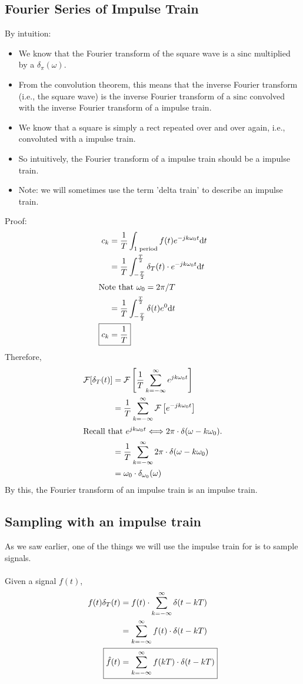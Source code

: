\documentclass[10pt]{article}
\newcommand{\sinc}{\text{sinc}}
\newcommand{\rect}{\text{rect}}
\newcommand{\llra}{\Longleftrightarrow}
\newcommand{\fourier}{\mathcal{F}}
\newcommand{\dd}{\text{d}}
\begin{document}
\subsection*{Fourier Series of Impulse Train}
By intuition:
\begin{itemize}
    \item We know that the Fourier transform of the square wave is a $\sinc$ multiplied by a $\delta_\pi(\omega)$.
    \item From the convolution theorem, this means that the inverse Fourier transform (i.e., the square wave) is the inverse Fourier transform of a $\sinc$ convolved with the inverse Fourier transform of a impulse train.
    \item We know that a square is simply a $\rect$ repeated over and over again, i.e., convoluted with a impulse train.
    \item So intuitively, the Fourier transform of a impulse train should be a impulse train.
    \item Note: we will sometimes use the term 'delta train' to describe an impulse train.
\end{itemize}
Proof:
\begin{align*}
    c_k &= \frac{1}{T} \int_{\text{1 period}} f(t) e^{-jk\omega_0 t} \dd t\\
    &= \frac{1}{T} \int_{-\frac{T}{2}}^{\frac{T}{2}} \delta_T(t) \cdot e^{-jk\omega_0 t} \dd t\\
    \intertext{Note that $\omega_0 = 2\pi/T$}
    &= \frac{1}{T} \int_{-\frac{T}{2}}^{\frac{T}{2}} \delta(t) e^0 \dd t\\
    \Aboxed{c_k &= \frac{1}{T}}
\end{align*}
Therefore,
\begin{align*}
    \fourier[\delta_T(t)] &= \fourier\left[\frac{1}{T} \sum_{k=-\infty}^\infty e^{jk\omega_0 t}\right]\\
    &= \frac{1}{T} \sum_{k=-\infty}^\infty \fourier\left[e^{-jk\omega_0 t}\right]\\
    \intertext{Recall that $e^{jk\omega_0 t} \llra 2\pi \cdot \delta(\omega - k\omega_0)$.}
    &= \frac{1}{T} \sum_{k=-\infty}^\infty 2\pi \cdot \delta(\omega - k\omega_0)\\
    &= \omega_0 \cdot \delta_{\omega_0}(\omega)
\end{align*}
By this, the Fourier transform of an impulse train is an impulse train.
\subsection*{Sampling with an impulse train}
As we saw earlier, one of the things we will use the impulse train for is to sample signals.\\\\
Given a signal $f(t)$,
\begin{align*}
    f(t) \delta_T(t) &= f(t) \cdot \sum_{k=-\infty}^\infty \delta(t - kT)\\
    &= \sum_{k=-\infty}^\infty f(t) \cdot \delta(t - kT)\\
    \Aboxed{\hat{f}(t) &= \sum_{k=-\infty}^\infty f(kT) \cdot \delta(t - kT)}
\end{align*}
\end{document}
